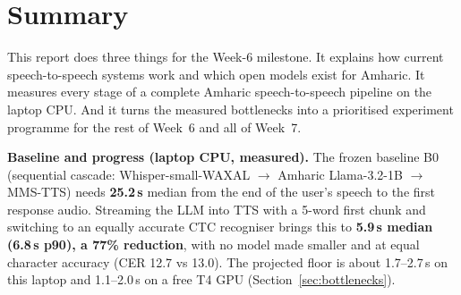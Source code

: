 \section*{Summary}

This report does three things for the Week-6 milestone. It explains how current speech-to-speech systems
work and which open models exist for Amharic. It measures every stage of a complete Amharic
speech-to-speech pipeline on the laptop CPU. And it turns the measured bottlenecks into a prioritised
experiment programme for the rest of Week~6 and all of Week~7.

\begin{keybox}
\textbf{Baseline and progress (laptop CPU, measured).} The frozen baseline B0 (sequential cascade:
Whisper-small-WAXAL $\rightarrow$ Amharic Llama-3.2-1B $\rightarrow$ MMS-TTS) needs \textbf{25.2\,s} median
from the end of the user's speech to the first response audio. Streaming the LLM into TTS with a
5-word first chunk and switching to an equally accurate CTC recogniser brings this to \textbf{5.9\,s
median (6.8\,s p90), a 77\% reduction}, with no model made smaller and at equal character accuracy (CER 12.7 vs 13.0). The projected
floor is about 1.7--2.7\,s on this laptop and 1.1--2.0\,s on a free T4 GPU (Section~\ref{sec:bottlenecks}).
\end{keybox}

